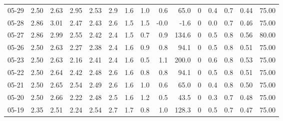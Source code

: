 \begin{threeparttable}
{\begin{tabular}{lrrrrrrrrrrrrrr}
  05-29 &          2.50 &          2.63 &          2.95 &        2.53 &                 2.9 &                1.6 &                 1.0 &        0.6 &         65.0 &              0 &                 0.4 &              0.7 &            0.44 &                  75.00 \\
  05-28 &          2.86 &          3.01 &          2.47 &        2.43 &                 2.6 &                1.5 &                 1.5 &       -0.0 &         -1.6 &              0 &                 0.0 &              0.7 &            0.46 &                  75.00 \\
  05-27 &          2.86 &          2.99 &          2.55 &        2.42 &                 2.4 &                1.5 &                 0.7 &        0.9 &        134.6 &              0 &                 0.5 &              0.8 &            0.56 &                  80.00 \\
  05-26 &          2.50 &          2.63 &          2.27 &        2.38 &                 2.4 &                1.6 &                 0.9 &        0.8 &         94.1 &              0 &                 0.5 &              0.8 &            0.51 &                  75.00 \\
  05-23 &          2.50 &          2.63 &          2.16 &        2.41 &                 2.4 &                1.6 &                 0.5 &        1.1 &        200.0 &              0 &                 0.6 &              0.8 &            0.53 &                  75.00 \\
  05-22 &          2.50 &          2.64 &          2.42 &        2.48 &                 2.6 &                1.6 &                 0.8 &        0.8 &         94.1 &              0 &                 0.5 &              0.8 &            0.51 &                  75.00 \\
  05-21 &          2.50 &          2.65 &          2.54 &        2.49 &                 2.6 &                1.6 &                 1.0 &        0.6 &         65.0 &              0 &                 0.4 &              0.8 &            0.50 &                  75.00 \\
  05-20 &          2.50 &          2.66 &          2.22 &        2.48 &                 2.5 &                1.6 &                 1.2 &        0.5 &         43.5 &              0 &                 0.3 &              0.7 &            0.48 &                  75.00 \\
  05-19 &          2.35 &          2.51 &          2.24 &        2.54 &                 2.7 &                1.7 &                 0.8 &        1.0 &        128.3 &              0 &                 0.5 &              0.7 &            0.47 &                  75.00 \\

\end{tabular}}
\end{threeparttable}
